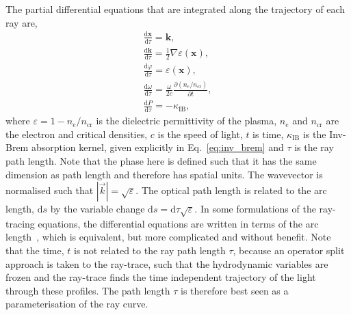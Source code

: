 The partial differential equations that are integrated along the trajectory of each ray are,
\begin{equation}
    \label{eq:SOLAS_rays}
    \begin{gathered}
        \frac{\text{d} \mathbf{x}}{\text{d} \tau}=\mathbf{k}, \\
        \frac{\text{d} \mathbf{k}}{\text{d} \tau}=\frac{1}{2} \nabla \varepsilon(\mathbf{x}), \\
        \frac{\text{d} \varphi}{\text{d} \tau}= \varepsilon(\mathbf{x}), \\
        \frac{\text{d} \omega}{\text{d} \tau}=\frac{\omega}{2 c} \frac{\partial\left(n_e / n_{\text{cr}}\right)}{\partial t}, \\
        \frac{\text{d} P}{\text{d} \tau}=-\kappa_{\text{IB}},
    \end{gathered}
\end{equation}
where $\varepsilon=1-n_e/n_{\text{cr}}$ is the dielectric permittivity of the plasma, $n_e$ and $n_{\text{cr}}$ are the electron and critical densities, $c$ is the speed of light, $t$ is time, $\kappa_{\text{IB}}$ is the \ac{Inv-Brem} absorption kernel, given explicitly in Eq.~\ref{eq:inv_brem} and $\tau$ is the ray path length.
Note that the phase here is defined such that it has the same dimension as path length and therefore has spatial units.
The wavevector is normalised such that $|\vec{k}|=\sqrt{\varepsilon}$.
The optical path length is related to the arc length, $\text{d}s$ by the variable change $\text{d}s=\text{d}\tau\sqrt{\varepsilon}$.
In some formulations of the ray-tracing equations, the differential equations are written in terms of the arc length~\cite{marozas_wavelength-detuning_2018,kaiser_laser_2000}, which is equivalent, but more complicated and without benefit.
Note that the time, $t$ is not related to the ray path length $\tau$, because an operator split approach is taken to the ray-trace, such that the hydrodynamic variables are frozen and the ray-trace finds the time independent trajectory of the light through these profiles.
The path length $\tau$ is therefore best seen as a parameterisation of the ray curve.

